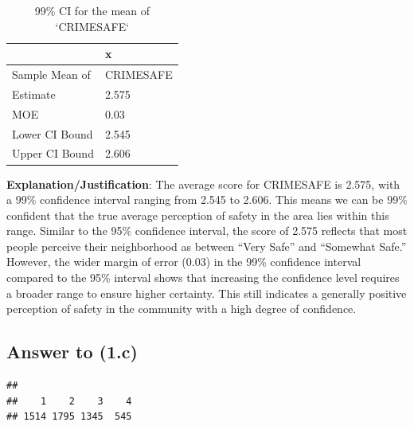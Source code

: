 \documentclass[
  11pt,
]{article}
\newenvironment{Shaded}{\begin{snugshade}}{\end{snugshade}}
\newcommand{\CommentTok}[1]{\textcolor[rgb]{0.56,0.35,0.01}{\textit{#1}}}
\newcommand{\FunctionTok}[1]{\textcolor[rgb]{0.13,0.29,0.53}{\textbf{#1}}}
\newcommand{\NormalTok}[1]{#1}
\newcommand{\SpecialCharTok}[1]{\textcolor[rgb]{0.81,0.36,0.00}{\textbf{#1}}}
\begin{document}
\begin{table}

\caption{\label{tab:q1-b}99\% CI for the mean of `CRIMESAFE`}
\centering
\begin{tabular}[t]{l|l}
\hline
  & x\\
\hline
Sample Mean of & CRIMESAFE\\
\hline
Estimate & 2.575\\
\hline
MOE & 0.03\\
\hline
Lower CI Bound & 2.545\\
\hline
Upper CI Bound & 2.606\\
\hline
\end{tabular}
\end{table}

\textbf{Explanation/Justification}: The average score for CRIMESAFE is
2.575, with a 99\% confidence interval ranging from 2.545 to 2.606. This
means we can be 99\% confident that the true average perception of
safety in the area lies within this range. Similar to the 95\%
confidence interval, the score of 2.575 reflects that most people
perceive their neighborhood as between ``Very Safe'' and ``Somewhat
Safe.'' However, the wider margin of error (0.03) in the 99\% confidence
interval compared to the 95\% interval shows that increasing the
confidence level requires a broader range to ensure higher certainty.
This still indicates a generally positive perception of safety in the
community with a high degree of confidence.

\subsection{Answer to (1.c)}\label{answer-to-1.c}

\begin{Shaded}
\end{Shaded}

\begin{verbatim}
## 
##    1    2    3    4 
## 1514 1795 1345  545
\end{verbatim}
\end{document}

